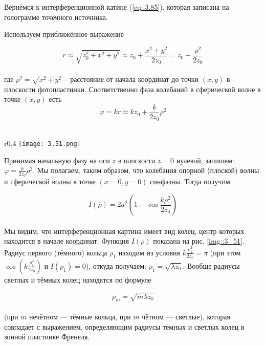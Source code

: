 Вернёмся к интерференционной катине (\ref{eq::3.85}), которая записана на голограмме точечного
источника. 

Используем приближённое выражение

\begin{equation}
r \approx \sqrt{z_0^2 + x^2 + y^2} \approx z_0 + \frac{x^2 + y^2}{2 z_0} = z_0 + \frac{\rho^2}{2 z_0}
\end{equation}
\\
где $\rho^2 = \sqrt{x^2 + y^2}$ -- расстояние от начала координат до точки $(x, y)$ в плоскости
фотопластинки. Соответственно фаза колебаний в сферической волне в точке $(x, y)$ есть
\newpage
\begin{equation}\label{eq::3.86}
\varphi = k r \approx k z_0 + \frac{k}{2 z_0} \rho^2
\end{equation}
\\
\begin{wrapfigure}{r}{0.4\linewidth}
    \texttt{[image: 3.51.png]}
    \caption{Зависимость $I(\rho)$}
    \label{img::3_51}
\end{wrapfigure}

Принимая начальную фазу на оси $z$ в плоскости $z = 0$ нулевой, запишем:
$\varphi = \frac{k}{2 z_0} \rho^2$. Мы полагаем, таким образом, что колебания опорной (плоской)
волны и сферической волны в точке $(x = 0,y = 0)$ синфазны. Тогда получим

\begin{equation}
    I(\rho) = 2 a^2 \left( 1 + \cos \frac{k \rho^2}{2 z_0} \right)
\end{equation}
\\
Мы видим, что интерференционная картина имеет вид колец, центр которых находится в начале координат. 
Функция $I(\rho)$ показана на рис. \ref{img::3_51}. Радиус первого (тёмного) кольца $\rho_1$
находим из условия $k \frac{\rho_1^2}{2 z_0} = \pi$ (при этом 
$\cos \left( k \frac{\rho_1^2}{2 z_0} \right)$ и $I(\rho_1) = 0$), откуда получаем: 
$\rho_1 = \sqrt{\lambda z_0}$. Вообще радиусы светлых и тёмных колец находятся по формуле

\begin{equation}
    \rho_m  = \sqrt{m \lambda z_0}
\end{equation}
\\
(при $m$ нечётном — тёмные кольца, при $m$ чётном — светлые), которая совпадает с выражением, 
определяющим радиусы тёмных и светлых колец в зонной пластинке Френеля.

